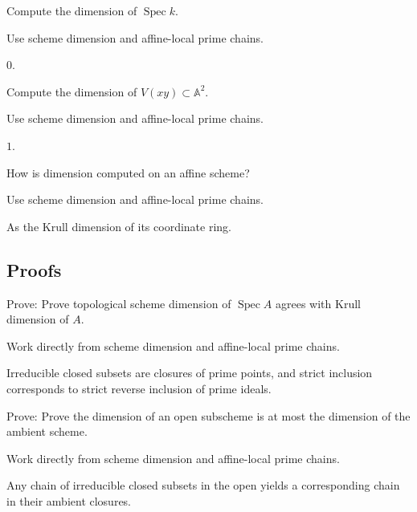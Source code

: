 \begin{exercise}[Point]\label{exr:vi30-expand-03}
Compute the dimension of $\operatorname{Spec}k$.
\end{exercise}
\begin{hint}
Use scheme dimension and affine-local prime chains.
\end{hint}
\begin{solution}
$0$.
\end{solution}

\begin{exercise}\label{exr:vi30-expand-04}
Compute the dimension of $V(xy)\subset\mathbb A^2$.
\end{exercise}
\begin{hint}
Use scheme dimension and affine-local prime chains.
\end{hint}
\begin{solution}
$1$.
\end{solution}

\begin{exercise}\label{exr:vi30-expand-05}
How is dimension computed on an affine scheme?
\end{exercise}
\begin{hint}
Use scheme dimension and affine-local prime chains.
\end{hint}
\begin{solution}
As the Krull dimension of its coordinate ring.
\end{solution}

\subsection*{Proofs}

\begin{exercise}\label{exr:vi30-expand-06}
Prove: Prove topological scheme dimension of $\operatorname{Spec}A$ agrees with Krull dimension of $A$.
\end{exercise}
\begin{hint}
Work directly from scheme dimension and affine-local prime chains.
\end{hint}
\begin{solution}
Irreducible closed subsets are closures of prime points, and strict inclusion corresponds to strict reverse inclusion of prime ideals.
\end{solution}

\begin{exercise}\label{exr:vi30-expand-07}
Prove: Prove the dimension of an open subscheme is at most the dimension of the ambient scheme.
\end{exercise}
\begin{hint}
Work directly from scheme dimension and affine-local prime chains.
\end{hint}
\begin{solution}
Any chain of irreducible closed subsets in the open yields a corresponding chain in their ambient closures.
\end{solution}

